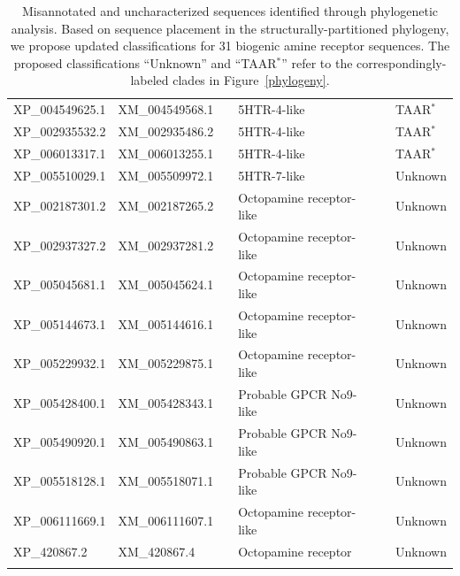 \documentclass[fleqn,10pt]{wlpeerj}
\begin{document}
\begin{table}[htbp]
\begin{tabular}{l l l l l l}
		XP\_004549625.1 & XM\_004549568.1 & \qquad \qquad & 5HTR-4-like & \qquad \qquad & TAAR$^\ast$ \\
		XP\_002935532.2 & XM\_002935486.2 & \qquad \qquad & 5HTR-4-like & \qquad \qquad & TAAR$^\ast$ \\
		XP\_006013317.1 & XM\_006013255.1 & \qquad \qquad & 5HTR-4-like & \qquad \qquad & TAAR$^\ast$ \\	
		XP\_005510029.1 & XM\_005509972.1 & \qquad \qquad & 5HTR-7-like & \qquad \qquad & Unknown \\
		XP\_002187301.2 & XM\_002187265.2 & \qquad \qquad & Octopamine receptor-like & \qquad \qquad & Unknown \\
		XP\_002937327.2 & XM\_002937281.2 & \qquad \qquad & Octopamine receptor-like & \qquad \qquad & Unknown \\
		XP\_005045681.1 & XM\_005045624.1 & \qquad \qquad & Octopamine receptor-like & \qquad \qquad & Unknown \\
		XP\_005144673.1 & XM\_005144616.1 & \qquad \qquad & Octopamine receptor-like & \qquad \qquad & Unknown \\
		XP\_005229932.1 & XM\_005229875.1 & \qquad \qquad & Octopamine receptor-like & \qquad \qquad & Unknown \\
		XP\_005428400.1 & XM\_005428343.1 & \qquad \qquad & Probable GPCR No9-like & \qquad \qquad & Unknown \\
		XP\_005490920.1 & XM\_005490863.1 & \qquad \qquad & Probable GPCR No9-like & \qquad \qquad & Unknown \\
		XP\_005518128.1 & XM\_005518071.1 & \qquad \qquad & Probable GPCR No9-like & \qquad \qquad & Unknown \\
		XP\_006111669.1 & XM\_006111607.1 & \qquad \qquad & Octopamine receptor-like & \qquad \qquad & Unknown \\
		XP\_420867.2 & XM\_420867.4 & \qquad \qquad & Octopamine receptor & \qquad \qquad & Unknown \\
		\noalign{\smallskip}\hline\noalign{\smallskip} 
	\end{tabular}
	\caption{\label{tab:classif} Misannotated and uncharacterized sequences identified through phylogenetic analysis. Based on sequence placement in the structurally-partitioned phylogeny, we propose updated classifications for 31 biogenic amine receptor sequences. The proposed classifications ``Unknown'' and ``TAAR$^\ast$'' refer to the correspondingly-labeled clades in Figure~\ref{phylogeny}.}
\end{table}
\end{document}
